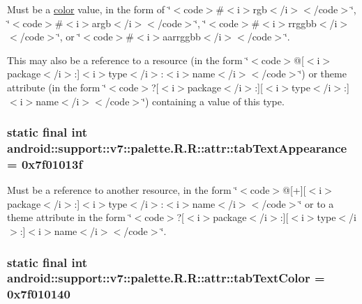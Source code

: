 Must be a \hyperlink{classandroid_1_1support_1_1v7_1_1palette_1_1_r_1_1color}{color} value, in the form of \char`\"{}$<$code$>$\#$<$i$>$rgb$<$/i$>$$<$/code$>$\char`\"{}, \char`\"{}$<$code$>$\#$<$i$>$argb$<$/i$>$$<$/code$>$\char`\"{}, \char`\"{}$<$code$>$\#$<$i$>$rrggbb$<$/i$>$$<$/code$>$\char`\"{}, or \char`\"{}$<$code$>$\#$<$i$>$aarrggbb$<$/i$>$$<$/code$>$\char`\"{}. 

This may also be a reference to a resource (in the form \char`\"{}$<$code$>$@\mbox{[}$<$i$>$package$<$/i$>$:\mbox{]}$<$i$>$type$<$/i$>$:$<$i$>$name$<$/i$>$$<$/code$>$\char`\"{}) or theme attribute (in the form \char`\"{}$<$code$>$?\mbox{[}$<$i$>$package$<$/i$>$:\mbox{]}\mbox{[}$<$i$>$type$<$/i$>$:\mbox{]}$<$i$>$name$<$/i$>$$<$/code$>$\char`\"{}) containing a value of this type. \hypertarget{classandroid_1_1support_1_1v7_1_1palette_1_1_r_1_1attr_0f963680444adaa6b37de97f584c2a95}{
\subsubsection[{tabTextAppearance}]{\setlength{\rightskip}{0pt plus 5cm}static final int android::support::v7::palette.R.R::attr::tabTextAppearance = 0x7f01013f}}
\label{classandroid_1_1support_1_1v7_1_1palette_1_1_r_1_1attr_0f963680444adaa6b37de97f584c2a95}


Must be a reference to another resource, in the form \char`\"{}$<$code$>$@\mbox{[}+\mbox{]}\mbox{[}$<$i$>$package$<$/i$>$:\mbox{]}$<$i$>$type$<$/i$>$:$<$i$>$name$<$/i$>$$<$/code$>$\char`\"{} or to a theme attribute in the form \char`\"{}$<$code$>$?\mbox{[}$<$i$>$package$<$/i$>$:\mbox{]}\mbox{[}$<$i$>$type$<$/i$>$:\mbox{]}$<$i$>$name$<$/i$>$$<$/code$>$\char`\"{}. \hypertarget{classandroid_1_1support_1_1v7_1_1palette_1_1_r_1_1attr_72fac60bcc123b4cb6ee7b58e1189bfa}{
\subsubsection[{tabTextColor}]{\setlength{\rightskip}{0pt plus 5cm}static final int android::support::v7::palette.R.R::attr::tabTextColor = 0x7f010140}}
\label{classandroid_1_1support_1_1v7_1_1palette_1_1_r_1_1attr_72fac60bcc123b4cb6ee7b58e1189bfa}


